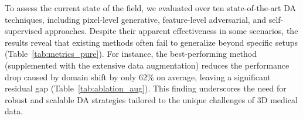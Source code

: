 To assess the current state of the field, we evaluated over ten state-of-the-art DA techniques, including pixel-level generative, feature-level adversarial, and self-supervised approaches. Despite their apparent effectiveness in some scenarios, the results reveal that existing methods often fail to generalize beyond specific setups (Table~\ref{tab:metrics_pure}). For instance, the best-performing method (supplemented with the extensive data augmentation) reduces the performance drop caused by domain shift by only 62\% on average, leaving a significant residual gap (Table~\ref{tab:ablation_aug}). This finding underscores the need for robust and scalable DA strategies tailored to the unique challenges of 3D medical data.

\begin{table}
	\centering
	\caption{Main results on M3DA benchmark in terms of multiclass average Dice score, where background label is excluded from quantification. The best results in each column are highlighted in \textbf{bold}. Case-wise standard deviations for these experiments are provided in parentheses.} %
	
\end{table}
